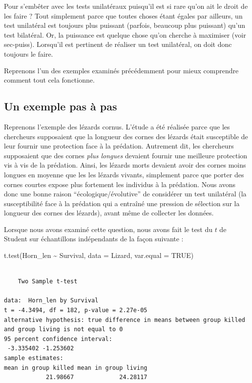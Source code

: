 \documentclass[
  french,
  a4paper,
  DIV=11,
  numbers=noendperiod,
  oneside]{scrreprt}
\newenvironment{Shaded}{}{}
\newcommand{\AttributeTok}[1]{\textcolor[rgb]{0.84,0.23,0.29}{#1}}
\newcommand{\ConstantTok}[1]{\textcolor[rgb]{0.00,0.36,0.77}{#1}}
\newcommand{\FunctionTok}[1]{\textcolor[rgb]{0.44,0.26,0.76}{#1}}
\newcommand{\NormalTok}[1]{\textcolor[rgb]{0.14,0.16,0.18}{#1}}
\newcommand{\SpecialCharTok}[1]{\textcolor[rgb]{0.00,0.36,0.77}{#1}}
\begin{document}
Pour s'embêter avec les tests unilatéraux puisqu'il est si rare qu'on
ait le droit de les faire ? Tout simplement parce que toutes choses
étant égales par ailleurs, un test unilatéral est toujours plus puissant
(parfois, beaucoup plus puissant) qu'un test bilatéral. Or, la puissance
est quelque chose qu'on cherche à maximiser (voir sec-puiss). Lorsqu'il
est pertinent de réaliser un test unilatéral, on doit donc toujours le
faire.

Reprenons l'un des exemples examinés précédemment pour mieux comprendre
comment tout cela fonctionne.

\subsection{Un exemple pas à pas}\label{un-exemple-pas-uxe0-pas}

Reprenons l'exemple des lézards cornus. L'étude a été réalisée parce que
les chercheurs supposaient que la longueur des cornes des lézards était
susceptible de leur fournir une protection face à la prédation.
Autrement dit, les chercheurs supposaient que des cornes \emph{plus
longues} devaient fournir une meilleure protection vis à vis de la
prédation. Ainsi, les lézards morts devaient avoir des cornes moins
longues en moyenne que les les lézards vivants, simplement parce que
porter des cornes courtes expose plus fortement les individus à la
prédation. Nous avons donc une bonne raison ``écologique/évolutive'' de
considérer un test unilatéral (la susceptibilité face à la prédation qui
a entraîné une pression de sélection sur la longueur des cornes des
lézards), avant même de collecter les données.

Lorsque nous avons examiné cette question, nous avons fait le test du
\(t\) de Student sur échantillons indépendants de la façon suivante :

\begin{Shaded}
\begin{Highlighting}[]
\FunctionTok{t.test}\NormalTok{(Horn\_len }\SpecialCharTok{\textasciitilde{}}\NormalTok{ Survival, }\AttributeTok{data =}\NormalTok{ Lizard, }\AttributeTok{var.equal =} \ConstantTok{TRUE}\NormalTok{)}
\end{Highlighting}
\end{Shaded}

\begin{verbatim}

    Two Sample t-test

data:  Horn_len by Survival
t = -4.3494, df = 182, p-value = 2.27e-05
alternative hypothesis: true difference in means between group killed and group living is not equal to 0
95 percent confidence interval:
 -3.335402 -1.253602
sample estimates:
mean in group killed mean in group living 
            21.98667             24.28117 
\end{verbatim}
\end{document}
